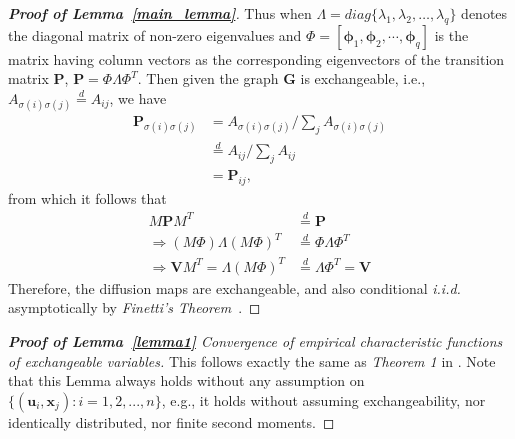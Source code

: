 \documentclass[11pt]{article}
\theoremstyle{definition}
\begin{document}
\begin{proof}[\textbf{Proof of Lemma~\ref{main_lemma}}]
Thus when $\Lambda=diag\{ \lambda_{1},\lambda_2,\ldots,\lambda_q \}$ denotes the diagonal matrix of non-zero eigenvalues and $\Phi =[ \mathbf{\phi}_1, \mathbf{\phi}_2,\cdots, \mathbf{\phi}_q ]$ is the matrix having column vectors as the corresponding eigenvectors of the transition matrix $\mathbf{P}$, $\mathbf{P}=\Phi \Lambda \Phi^{T}$. Then given the graph $\mathbf{G}$ is exchangeable, i.e., $A_{\sigma(i)\sigma(j)} \stackrel{d}{=} A_{ij}$, we have
\begin{align*}
\mathbf{P}_{\sigma(i) \sigma(j)} &= A_{\sigma(i) \sigma(j)} / \sum\limits_{j} A_{\sigma(i)\sigma(j)} \\
 &\stackrel{d}{=} A_{ij} /  \sum\limits_{j} A_{ij} \\
&= \mathbf{P}_{ij},
\end{align*}
 from which it follows that
\begin{align*}
	 M \mathbf{P} M^{T} &\stackrel{d}{=} \mathbf{P} \\
	  \Rightarrow (M \Phi) \Lambda (M \Phi)^{T} &\stackrel{d}{=} \Phi \Lambda \Phi^{T} \\
		\Rightarrow \mathbf{V} M^{T}= \Lambda (M \Phi)^{T} &\stackrel{d}{=} \Lambda \Phi^{T} = \mathbf{V}
\end{align*}	
Therefore, the diffusion maps are exchangeable, and also conditional \textit{i.i.d.} asymptotically by \textit{Finetti’s Theorem}~\cite{diaconis1980finite,orbanz2015bayesian}.
\end{proof}

\begin{proof}[\textbf{Proof of Lemma~\ref{lemma1}} Convergence of empirical characteristic functions of exchangeable variables] 
	This follows exactly the same as \textit{Theorem 1} in \cite{szekely2007measuring}. Note that this Lemma always holds without any assumption on $\{(\mathbf{u}_{i},\mathbf{x}_{j}) :  i=1,2,...,n\}$, e.g., it holds without assuming exchangeability, nor identically distributed, nor finite second moments.
\end{proof}
\end{document}

